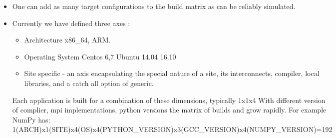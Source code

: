 \documentclass[17pt, a0paper, landscape, margin=0mm, innermargin=15mm,
     blockverticalspace=5mm, colspace=5mm, subcolspace=8mm]{tikzposter} %
\begin{document}
\begin{columns}
{             \begin{itemize}
                 \item One can add as many target configurations to the build matrix as can be reliably simulated.
                 \item Currently we have defined three axes :
                 \begin{itemize}
                    \item Architecture x86\_64, ARM.
                    \item Operating System Centos 6,7  Ubuntu 14.04 16.10
                    \item Site specific - an axis encapsulating the special nature of a site, its interconnects, compiler, local libraries, and a catch all option of generic.
                 \end{itemize} 
                     Each application is built for a combination of these dimensions, typically 1x1x4
                     With different version of complier, mpi implementations, python versions the matrix of builds and grow rapidly. 
                     For example NumPy has:\\
                     1(ARCH)x1(SITE)x4(OS)x4(PYTHON\_VERSION)x3(GCC\_VERSION)x4(NUMPY\_VERSION)=192
             \end{itemize}
        }


\end{columns}
\end{document}
